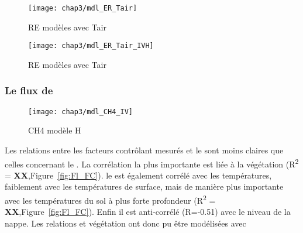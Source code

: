 \begin{figure}
\centering
\texttt{[image: chap3/mdl\_ER\_Tair]}
\caption{RE modèles avec Tair}
\label{fig:mdl_ER_Tair}
\end{figure}

\begin{figure}
\centering
\texttt{[image: chap3/mdl\_ER\_Tair\_IVH]}
\caption{RE modèles avec Tair}
\label{fig:ER_mdl_TairIVH}
\end{figure}

%
%
%
%

\subsubsection{Le flux de \chh}

\begin{figure}
\centering
\texttt{[image: chap3/mdl\_CH4\_IV]}
\caption{CH4 modèle H}
\label{fig:CH4_mdl}
\end{figure}

Les relations entre les facteurs contrôlant mesurés et le \chh sont moins claires que celles concernant le \coo.
La corrélation la plus importante est liée à la végétation (R\textsuperscript{2} = \textbf{XX},Figure~\ref{fig:Fl_FC}). 
le \chh est également corrélé avec les températures, faiblement avec les températures de surface, mais de manière plus importante avec les températures du sol à plus forte profondeur (R\textsuperscript{2} = \textbf{XX},Figure~\ref{fig:Fl_FC}).
Enfin il est anti-corrélé (R=-0.51) avec le niveau de la nappe.
Les relations \chh et végétation ont donc pu être modélisées avec 

